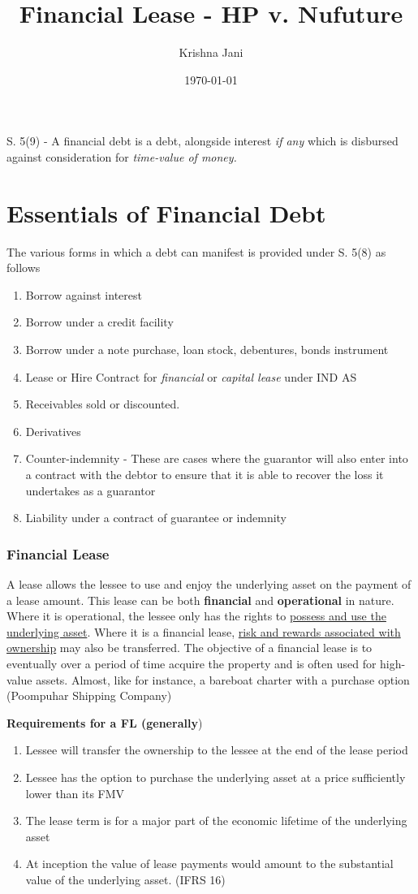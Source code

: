 \documentclass[12pt]{article}
\author{Krishna Jani}
\date{\today}
\title{Financial Lease - HP v. Nufuture}
\begin{document}
\maketitle

S. 5(9) - A financial debt is a debt, alongside interest \emph{if any} which is disbursed against consideration for \emph{time-value of money.}
\section{Essentials of Financial Debt}
\label{sec:org82e7169}

\noindent The various forms in which a debt can manifest is provided under S. 5(8) as follows
\begin{enumerate}
\item Borrow against interest
\item Borrow under a credit facility
\item Borrow under a note purchase, loan stock, debentures, bonds instrument
\item Lease or Hire Contract for \emph{financial} or \emph{capital lease} under IND AS
\item Receivables sold or discounted.
\item Derivatives
\item Counter-indemnity - These are cases where the guarantor will also enter into a contract with the debtor to ensure that it is able to recover the loss it undertakes as a guarantor
\item Liability under a contract of guarantee or indemnity
\end{enumerate}
\subsubsection{Financial Lease}
\label{sec:orge839971}
A lease allows the lessee to use and enjoy the underlying asset on the payment of a lease amount. This lease can be both \textbf{financial} and \textbf{operational} in nature. 
Where it is operational, the lessee only has the rights to \uline{possess and use the underlying asset}. Where it is a financial lease, \uline{risk and rewards associated with ownership} may also be transferred.
The objective of a financial lease is to eventually over a period of time acquire the property and is often used for high-value assets. Almost, like for instance, a bareboat charter with a purchase option (Poompuhar Shipping Company)

\noindent \textbf{Requirements for a FL (generally})
\begin{enumerate}
\item Lessee will transfer the ownership to the lessee at the end of the lease period
\item Lessee has the option to purchase the underlying asset at a price sufficiently lower than its FMV
\item The lease term is for a major part of the economic lifetime of the underlying asset
\item At inception the value of lease payments would amount to the substantial value of the underlying asset. (IFRS 16)
\end{enumerate}
\end{document}
